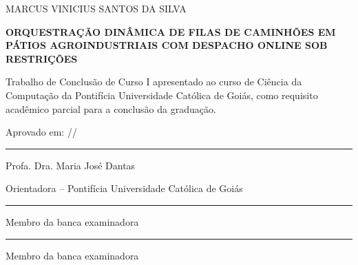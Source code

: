 \documentclass[
  12pt,
  oneside,
  a4paper,
  sumario=tradicional,
  brazil
]{abntex2}
\newcommand{\bodyfont}{\fontsize{12}{18}\selectfont}
\newcommand{\coverfont}{\fontsize{14}{21}\selectfont}
\newcommand{\smallfontdoc}{\fontsize{10}{12}\selectfont}
\begin{document}
\begin{folhadeaprovacao}
  \centering
  {\bodyfont MARCUS VINICIUS SANTOS DA SILVA\par}

  \vspace*{2.5cm}
  {\coverfont\bfseries ORQUESTRA\c{C}\~AO DIN\^AMICA DE FILAS DE CAMINH\~OES EM P\'ATIOS AGROINDUSTRIAIS COM DESPACHO ONLINE SOB RESTRI\c{C}\~OES\par}

  \vspace*{2.0cm}
  \hfill
  \begin{minipage}{8.35cm}
    \justifying
    \SingleSpacing
    \smallfontdoc
    Trabalho de Conclus\~ao de Curso I apresentado ao curso de Ci\^encia da Computa\c{c}\~ao da Pontif\'icia Universidade Cat\'olica de Goi\'as, como requisito acad\^emico parcial para a conclus\~ao da gradua\c{c}\~ao.
  \end{minipage}

  \vspace*{1.8cm}
  Aprovado em: \underline{\hspace{1.2cm}}/\underline{\hspace{1.2cm}}/\underline{\hspace{1.8cm}}

  \vspace*{1.5cm}
  \begin{center}
    \rule{10cm}{0.4pt}\par
    Profa. Dra. Maria Jos\'e Dantas\par
    Orientadora -- Pontif\'icia Universidade Cat\'olica de Goi\'as

    \vspace{1.2cm}
    \rule{10cm}{0.4pt}\par
    Membro da banca examinadora

    \vspace{1.2cm}
    \rule{10cm}{0.4pt}\par
    Membro da banca examinadora
  \end{center}
\end{folhadeaprovacao}
\end{document}
